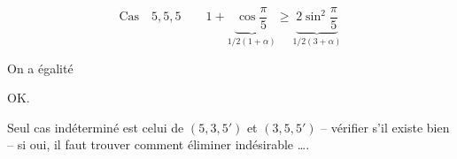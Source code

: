 \[
 \text{Cas}\quad\boxed{5,5,5}\qquad
 1+\underbrace{\cos\frac{\pi}{5}}_{1/2(1+\alpha)}
 \geq\underbrace{2\sin^2\frac{\pi}{5}}_{1/2(3+\alpha)}
\]

\qquad On a égalité

OK.

Seul cas indéterminé est celui de \uline{$(5,3,5')$} et \uline{$(3,5,5')$} -- vérifier s'il existe bien -- si oui, il faut trouver comment éliminer  \unsure{$\}$|$\xi$|$\int$} indésirable \ldots.

